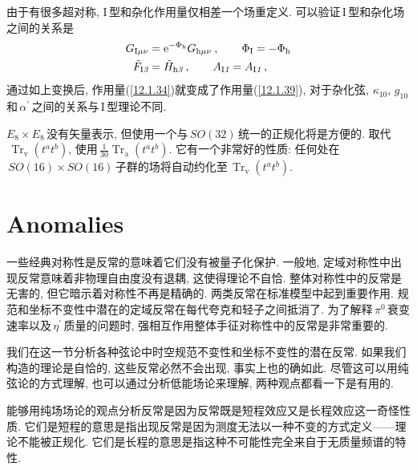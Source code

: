 由于有很多超对称, I\,型和杂化作用量仅相差一个场重定义. 可以验证\,I\,型和杂化场之间的关系是
\begin{subequations}
    \begin{align}
        G_{\text{I}\mu\nu}&=\mathrm{e}^{-\Phi_{\text{h}}}G_{\text{h}\mu\nu} \:, \qquad \Phi_{\text{I}} = -\Phi_{\text{h}} \label{12.1.41a} \\
        \tilde{F}_{\text{I}\textit{3}} &= \tilde{H}_{\text{h}\textit{3}} \:, \qquad A_{\text{I}\textit{1}} = A_{\text{I}\textit{1}} \:, \label{12.1.41b}
    \end{align}
\end{subequations}
通过如上变换后, 作用量(\ref{12.1.34})就变成了作用量(\ref{12.1.39}), 对于杂化弦, $\kappa_{10}$, $g_{10}\,$和$\,\alpha^{\prime}\,$之间的关系与\,I\,型理论不同.

$E_{8}\times E_{8}\,$没有矢量表示, 但使用一个与$\,SO(32)\,$统一的正规化将是方便的. 取代$\,\operatorname{Tr}_{\mathrm{v}}(t^{a}t^{b})$, 使用$\,\frac{1}{30}\operatorname{Tr}_{\mathrm{a}}(t^{a}t^{b})$. 它有一个非常好的性质: 任何处在$\,SO(16)\times SO(16)\,$子群的场将自动约化至$\,\operatorname{Tr}_{\mathrm{v}}(t^{a}t^{b})$.


\section{Anomalies}

一些经典对称性是反常的意味着它们没有被量子化保护. 一般地, 定域对称性中出现反常意味着非物理自由度没有退耦, 这使得理论不自恰. 整体对称性中的反常是无害的, 但它暗示着对称性不再是精确的. 两类反常在标准模型中起到重要作用. 规范和坐标不变性中潜在的定域反常在每代夸克和轻子之间抵消了. 为了解释$\,\pi^{0}\,$衰变速率以及$\,\eta^{\prime}\,$质量的问题时, 强相互作用整体手征对称性中的反常是非常重要的.

我们在这一节分析各种弦论中时空规范不变性和坐标不变性的潜在反常. 如果我们构造的理论是自恰的, 这些反常必然不会出现, 事实上也的确如此. 尽管这可以用纯弦论的方式理解, 也可以通过分析低能场论来理解, 两种观点都看一下是有用的.

能够用纯场场论的观点分析反常是因为反常既是短程效应又是长程效应这一奇怪性质. 它们是短程的意思是指出现反常是因为测度无法以一种不变的方式定义------理论不能被正规化. 它们是长程的意思是指这种不可能性完全来自于无质量频谱的特性.

